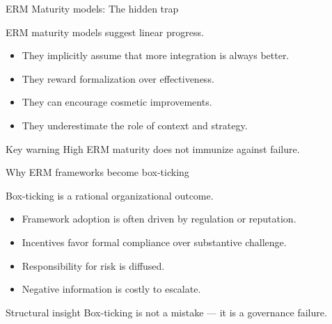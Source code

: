 \documentclass[aspectratio=169, 10pt]{beamer} %
\begin{document}
\begin{frame}{ERM Maturity models: The hidden trap}

ERM maturity models suggest linear progress.

\medskip

\begin{itemize}
    \item They implicitly assume that more integration is always better.
    
    \item They reward formalization over effectiveness.
    
    \item They can encourage cosmetic improvements.
    
    \item They underestimate the role of context and strategy.
\end{itemize}

\begin{block}{Key warning}
High ERM maturity does not immunize against failure.
\end{block}

\end{frame}
\begin{frame}{Why ERM frameworks become box-ticking}

Box-ticking is a rational organizational outcome.

\medskip

\begin{itemize}
    \item Framework adoption is often driven by regulation or reputation.
    
    \item Incentives favor formal compliance over substantive challenge.
    
    \item Responsibility for risk is diffused.
    
    \item Negative information is costly to escalate.
\end{itemize}

\begin{block}{Structural insight}
Box-ticking is not a mistake — it is a governance failure.
\end{block}

\end{frame}
\end{document}
